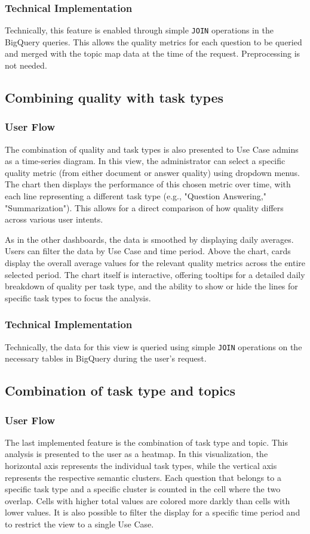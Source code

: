 \documentclass[
	english,
	ruledheaders=section,%
	class=report,%
	thesis={type=bachelor},%
	accentcolor=1b,%
	custommargins=true,%
	marginpar=false,%
	parskip=half-,%
	fontsize=11pt,%
	DIV=14,
]{tudapub}
\begin{document}
\subsubsection{Technical Implementation}
Technically, this feature is enabled through simple \texttt{JOIN} operations in the BigQuery queries. This allows the quality metrics for each question to be queried and merged with the topic map data at the time of the request. Preprocessing is not needed.
\subsection{Combining quality with task types}
\subsubsection{User Flow}
The combination of quality and task types is also presented to Use Case admins as a time-series diagram. In this view, the administrator can select a specific quality metric (from either document or answer quality) using dropdown menus. The chart then displays the performance of this chosen metric over time, with each line representing a different task type (e.g., "Question Answering," "Summarization"). This allows for a direct comparison of how quality differs across various user intents.

As in the other dashboards, the data is smoothed by displaying daily averages. Users can filter the data by Use Case and time period. Above the chart, cards display the overall average values for the relevant quality metrics across the entire selected period. The chart itself is interactive, offering tooltips for a detailed daily breakdown of quality per task type, and the ability to show or hide the lines for specific task types to focus the analysis.

\subsubsection{Technical Implementation}
Technically, the data for this view is queried using simple \texttt{JOIN} operations on the necessary tables in BigQuery during the user's request.
\subsection{Combination of task type and topics}
\subsubsection{User Flow}
The last implemented feature is the combination of task type and topic. This analysis is presented to the user as a heatmap. In this visualization, the horizontal axis represents the individual task types, while the vertical axis represents the respective semantic clusters. Each question that belongs to a specific task type and a specific cluster is counted in the cell where the two overlap. Cells with higher total values are colored more darkly than cells with lower values. It is also possible to filter the display for a specific time period and to restrict the view to a single Use Case.
\end{document}
